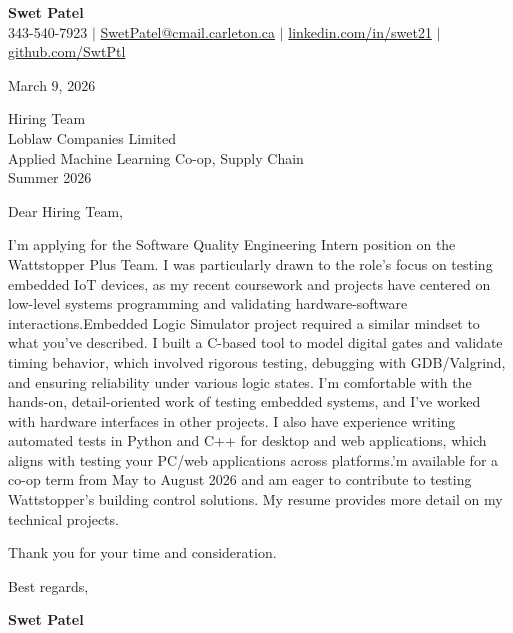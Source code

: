 \documentclass[letterpaper,11pt]{article}
\begin{document}
\begin{center}
    \textbf{\Large Swet Patel} \\[4pt]
    \small 343-540-7923 $|$
    \href{mailto:SwetPatel@cmail.carleton.ca}{SwetPatel@cmail.carleton.ca} $|$
    \href{https://linkedin.com/in/swet21}{linkedin.com/in/swet21} $|$
    \href{https://github.com/SwtPtl}{github.com/SwtPtl}
\end{center}

\vspace{8pt}
March 9, 2026

\vspace{8pt}
Hiring Team \\
Loblaw Companies Limited \\
Applied Machine Learning Co-op, Supply Chain \\
Summer 2026

\vspace{12pt}
Dear Hiring Team,


I'm applying for the Software Quality Engineering Intern position on the Wattstopper Plus Team. I was particularly drawn to the role's focus on testing embedded IoT devices, as my recent coursework and projects have centered on low-level systems programming and validating hardware-software interactions.\vspace{12pt}\nMy Embedded Logic Simulator project required a similar mindset to what you've described. I built a C-based tool to model digital gates and validate timing behavior, which involved rigorous testing, debugging with GDB/Valgrind, and ensuring reliability under various logic states. I'm comfortable with the hands-on, detail-oriented work of testing embedded systems, and I've worked with hardware interfaces in other projects. I also have experience writing automated tests in Python and C++ for desktop and web applications, which aligns with testing your PC/web applications across platforms.\vspace{12pt}\nI'm available for a co-op term from May to August 2026 and am eager to contribute to testing Wattstopper's building control solutions. My resume provides more detail on my technical projects.

\vspace{12pt}
Thank you for your time and consideration.

\vspace{16pt}
Best regards,

\vspace{4pt}
\textbf{Swet Patel}
\end{document}
